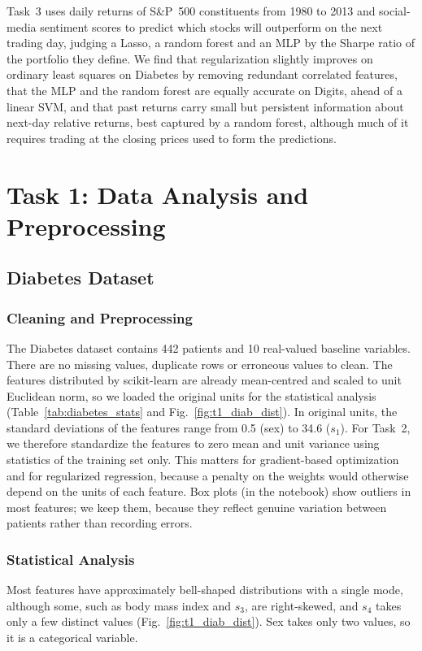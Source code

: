 \documentclass[conference]{IEEEtran}
\begin{document}
Task~3 uses daily returns of S\&P~500 constituents from 1980 to 2013 and social-media sentiment scores to predict which stocks will outperform on the next trading day, judging a Lasso, a random forest and an MLP by the Sharpe ratio of the portfolio they define. We find that regularization slightly improves on ordinary least squares on Diabetes by removing redundant correlated features, that the MLP and the random forest are equally accurate on Digits, ahead of a linear SVM, and that past returns carry small but persistent information about next-day relative returns, best captured by a random forest, although much of it requires trading at the closing prices used to form the predictions.


\section{Task 1: Data Analysis and Preprocessing}
\label{sec:task1}

\subsection{Diabetes Dataset}
\subsubsection{Cleaning and Preprocessing}
The Diabetes dataset contains 442 patients and 10 real-valued baseline variables. There are no missing values, duplicate rows or erroneous values to clean. The features distributed by scikit-learn are already mean-centred and scaled to unit Euclidean norm, so we loaded the original units for the statistical analysis (Table~\ref{tab:diabetes_stats} and Fig.~\ref{fig:t1_diab_dist}). In original units, the standard deviations of the features range from 0.5 (sex) to 34.6 ($s_1$). For Task~2, we therefore standardize the features to zero mean and unit variance using statistics of the training set only. This matters for gradient-based optimization and for regularized regression, because a penalty on the weights would otherwise depend on the units of each feature. Box plots (in the notebook) show outliers in most features; we keep them, because they reflect genuine variation between patients rather than recording errors.

\subsubsection{Statistical Analysis}
Most features have approximately bell-shaped distributions with a single mode, although some, such as body mass index and $s_3$, are right-skewed, and $s_4$ takes only a few distinct values (Fig.~\ref{fig:t1_diab_dist}). Sex takes only two values, so it is a categorical variable.
\end{document}
